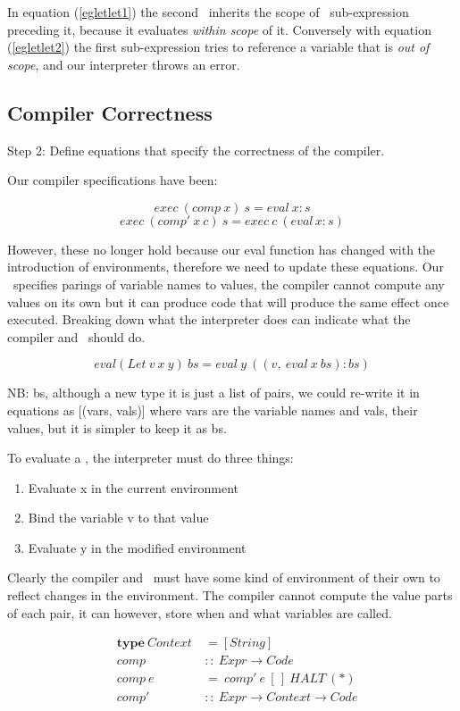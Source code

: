 \documentclass {article}
\begin{document}
In equation (\ref{egletlet1})
the second \add\ inherits
the scope of \ sub-expression 
preceding it, 
because it evaluates
\emph{within scope} of it.
Conversely with equation (\ref{egletlet2})
the first sub-expression tries to reference
a variable that is \emph{out of scope},
and our interpreter throws an error.



\subsection{Compiler Correctness}

Step 2: Define equations that specify the
	correctness of the compiler.

Our compiler specifications have been:

	\[ exec \  (comp \  x) \  s = eval \  x:s \]
	\[ exec \  (comp' \  x \  c) \ s = exec \  c \  (eval \, x:s) \]

However, these no longer hold
because our eval function has changed
with the introduction of environments,
therefore we need to update these equations.
\linebreak
Our \env\ specifies parings of 
variable names to values,
the compiler cannot compute any 
values on its own
but it can produce code that will
produce the same effect once executed.
Breaking down what the interpreter
does can indicate what the 
compiler and \vm\ should do.

\[eval(Let\ v\ x\ y)\ bs 
		= eval\ y\ ((v,\ eval\ x\ bs):bs) \]

NB: bs, although a new type it is just a list
of pairs, we could re-write it in equations as
[(vars, vals)] where vars are the variable names
and vals, their values,
but it is simpler to keep it as bs.

To evaluate a , the interpreter
must do three things:
\begin{enumerate}
	\item Evaluate x in the current environment
	\item Bind the variable v to that value
	\item Evaluate y in the modified environment
\end{enumerate}

Clearly the compiler and \vm\ must have some kind of
environment of their own to
reflect changes in the environment.
The compiler cannot compute the value
parts of each pair,
it can however, 
store when and what variables are called.

\begin{eqnarray*}
	&\textbf{type}\  Context\ &= [String] \\
	&comp &::\ Expr \rightarrow Code \\
	&comp\ e &=\ comp'\ e\ [\,]\ HALT\ (*)\\
	&comp' &::\ Expr \rightarrow Context \rightarrow Code
\end{eqnarray*}
\end{document}
